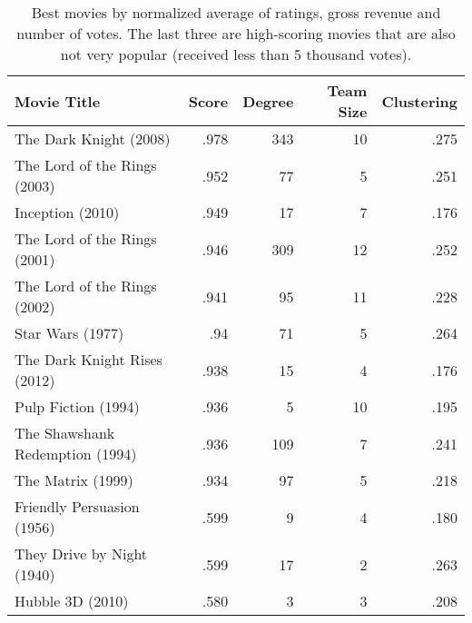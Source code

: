 \begin{table}[tb]
\caption{\label{tab:best_movies}Best movies by normalized average of ratings,
gross revenue and number of votes. The last three are high-scoring movies that
are also not very popular (received less than 5 thousand votes).}
\centering
\begin{tabular}{lrrrr}\toprule
Movie Title                     & Score      & Degree & Team Size & Clustering  \\ \toprule
The Dark Knight (2008)          & .978      & 343    & 10        & .275   \\
The Lord of the Rings (2003)    & .952      & 77     & 5         & .251   \\
Inception (2010)                & .949      & 17     & 7         & .176   \\
The Lord of the Rings (2001)    & .946      & 309    & 12        & .252   \\
The Lord of the Rings (2002)    & .941      & 95     & 11        & .228   \\
Star Wars (1977)                & .94       & 71     & 5         & .264   \\
The Dark Knight Rises (2012)    & .938      & 15     & 4         & .176   \\
Pulp Fiction (1994)             & .936      & 5      & 10        & .195   \\
The Shawshank Redemption (1994) & .936      & 109    & 7         & .241   \\
The Matrix (1999)               & .934      & 97     & 5         & .218   \\ \midrule
Friendly Persuasion (1956)      & .599      & 9      & 4         & .180   \\
They Drive by Night (1940)      & .599      & 17     & 2         & .263   \\
Hubble 3D (2010)                & .580      & 3      & 3         & .208   \\ \bottomrule
\end{tabular}
\end{table}
